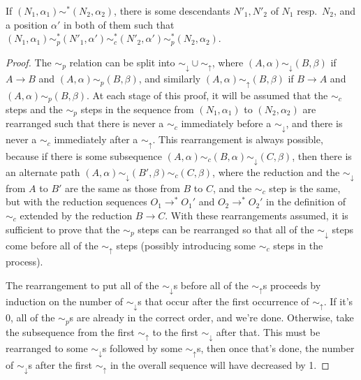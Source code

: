 \begin{lemma} \label{downAcrossUp}
If $(N_1,\alpha_1) \sim^* (N_2,\alpha_2)$, there is some descendants $N'_1, N'_2$ of $N_1$ resp.~$N_2$, and a position $\alpha'$ in both of them such that $(N_1,\alpha_1) \sim_p^* (N'_1, \alpha') \sim_c^* (N'_2, \alpha') \sim_p^* (N_2, \alpha_2)$.
\end{lemma}
\begin{proof}
  The $\sim_p$ relation can be split into $\sim_\downarrow \cup \sim_\uparrow$, where $(A,\alpha) \sim_\downarrow (B,\beta)$ if $A \to B$ and $(A,\alpha) \sim_p (B,\beta)$, and similarly $(A,\alpha) \sim_\uparrow (B,\beta)$ if $B \to A$ and $(A,\alpha) \sim_p (B,\beta)$. At each stage of this proof, it will be assumed that the $\sim_c$ steps and the $\sim_p$ steps in the sequence from $(N_1,\alpha_1)$ to $(N_2,\alpha_2)$ are rearranged such that there is never a $\sim_c$ immediately before a $\sim_\downarrow$, and there is never a $\sim_c$ immediately after a $\sim_\uparrow$. This rearrangement is always possible, because if there is some subsequence $(A,\alpha) \sim_c (B,\alpha) \sim_\downarrow (C,\beta)$, then there is an alternate path $(A,\alpha) \sim_\downarrow (B',\beta) \sim_c (C,\beta)$, where the reduction and the $\sim_\downarrow$ from $A$ to $B'$ are the same as those from $B$ to $C$, and the $\sim_c$ step is the same, but with the reduction sequences $O_1 \to^* O_1'$ and $O_2 \to^* O_2'$ in the definition of $\sim_c$ extended by the reduction $B \to C$. With these rearrangements assumed, it is sufficient to prove that the $\sim_p$ steps can be rearranged so that all of the $\sim_\downarrow$ steps come before all of the $\sim_\uparrow$ steps (possibly introducing some $\sim_c$ steps in the process).

  The rearrangement to put all of the $\sim_\downarrow$s before all of the $\sim_\uparrow$s proceeds by induction on the number of $\sim_\downarrow$s that occur after the first occurrence of $\sim_\uparrow$. If it's 0, all of the $\sim_p$s are already in the correct order, and we're done. Otherwise, take the subsequence from the first $\sim_\uparrow$ to the first $\sim_\downarrow$ after that. This must be rearranged to some $\sim_\downarrow$s followed by some $\sim_\uparrow$s, then once that's done, the number of $\sim_\downarrow$s after the first $\sim_\uparrow$ in the overall sequence will have decreased by 1.


\end{proof}
